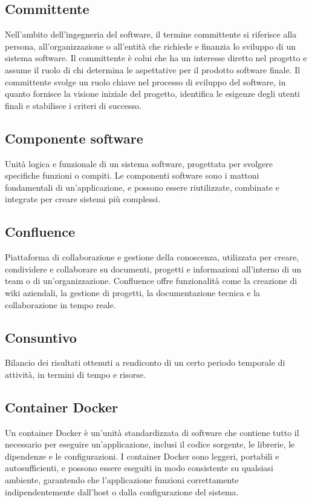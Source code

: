 \hypertarget{sec:committente}{}
\subsection*{Committente}
Nell’ambito dell’ingegneria del software, il termine committente si riferisce alla persona, all’organizzazione o all’entità che richiede e 
finanzia lo sviluppo di un sistema software. Il committente è colui che ha un interesse diretto nel progetto e assume il ruolo
di chi determina le aspettative per il prodotto software finale. Il committente svolge un ruolo chiave nel processo di sviluppo del software, 
in quanto fornisce la visione iniziale del progetto, identifica le esigenze degli utenti finali e stabilisce i criteri di successo.

\hypertarget{sec:componente software}{}
\subsection*{Componente software}
Unità logica e funzionale di un sistema software, progettata per svolgere specifiche funzioni o compiti. Le componenti software sono i mattoni
fondamentali di un'applicazione, e possono essere riutilizzate, combinate e integrate per creare sistemi più complessi.

\hypertarget{sec:confluence}{}
\subsection*{Confluence}
Piattaforma di collaborazione e gestione della conoscenza, utilizzata per creare, condividere e collaborare su documenti, progetti e informazioni all'interno 
di un team o di un'organizzazione. Confluence offre funzionalità come la creazione di wiki aziendali, la gestione di progetti, la documentazione tecnica e la 
collaborazione in tempo reale.

\hypertarget{sec:consuntivo}{}
\subsection*{Consuntivo}
Bilancio dei risultati ottenuti a rendiconto di un certo periodo temporale di attività, in termini di tempo e risorse.

\hypertarget{sec:container_docker}{}
\subsection*{Container Docker}
Un container Docker è un'unità standardizzata di software che contiene tutto il necessario per eseguire un'applicazione, inclusi il codice sorgente,
le librerie, le dipendenze e le configurazioni. I container Docker sono leggeri, portabili e autosufficienti, e possono essere eseguiti in modo
consistente su qualsiasi ambiente, garantendo che l'applicazione funzioni correttamente indipendentemente dall'host o dalla configurazione del sistema.

